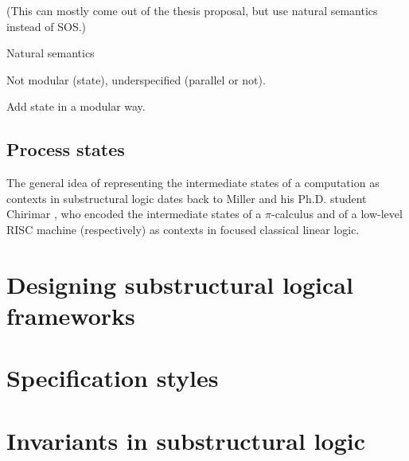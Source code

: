 (This can mostly come out of the thesis proposal, but use 
natural semantics instead of SOS.)

Natural semantics

Not modular (state), underspecified (parallel or not).


Add state in a modular way.

\subsection{Process states}

The general idea of representing the
intermediate states of a computation as contexts in substructural
logic dates back to Miller \cite{miller92pi} and his Ph.D. student
Chirimar \cite{chirimar95proof}, who encoded the intermediate states
of a $\pi$-calculus and of a low-level RISC machine (respectively) as
contexts in focused classical linear logic.

\section{Designing substructural logical frameworks}

\section{Specification styles}

\section{Invariants in substructural logic}
